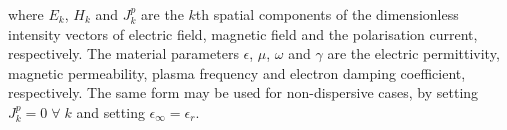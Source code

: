 where $E_k$, $H_k$ and $J^p_k$ are the $k$th spatial components of the dimensionless intensity vectors of electric field, magnetic field and the polarisation current, respectively. The material parameters $\epsilon$, $\mu$, $\omega$ and $\gamma$ are the electric permittivity, magnetic permeability, plasma frequency and electron damping coefficient, respectively. The same form may be used for non-dispersive cases, by setting $J^p_k = 0 \; \forall \; k$ and setting $\epsilon_{\infty} = \epsilon_{r}$.
%





